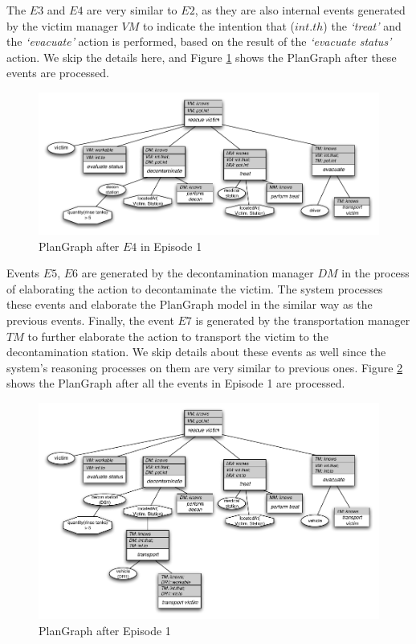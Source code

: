 The $E3$ and $E4$ are very similar to $E2$, as they are also internal events generated by the victim manager $VM$ to indicate the intention that ($int.th$) the \emph{`treat'} and the \emph{`evacuate'} action is performed, based on the result of the \emph{`evacuate status'} action. We skip the details here, and Figure \ref{fig:plangraph_ep1_e4} shows the PlanGraph after these events are processed.

\begin{figure}[htbp] %
	\centering
	\includegraphics[width=5.8in]{plangraph_ep1_e4.pdf} 
	\caption{PlanGraph after $E4$ in Episode 1}
	\label{fig:plangraph_ep1_e4}
\end{figure}

Events $E5$, $E6$ are generated by the decontamination manager $DM$ in the process of elaborating the action to decontaminate the victim. The system processes these events and elaborate the PlanGraph model in the similar way as the previous events. Finally, the event $E7$ is generated by the transportation manager $TM$ to further elaborate the action to transport the victim to the decontamination station. We skip details about these events as well since the system's reasoning processes on them are very similar to previous ones. Figure \ref{fig:plangraph_ep1_e7} shows the PlanGraph after all the events in Episode 1 are processed.

\begin{figure}[htbp] %
	\centering
	\includegraphics[width=5.8in]{plangraph_ep1_e7.pdf} 
	\caption{PlanGraph after Episode 1}
	\label{fig:plangraph_ep1_e7}
\end{figure}
